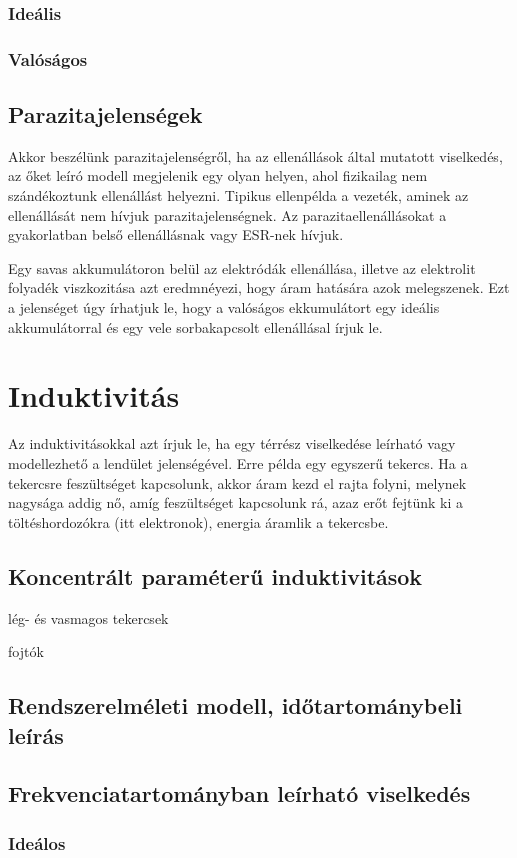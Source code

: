 \documentclass[12pt,a4paper]{article}
\begin{document}
\subsubsection{Ideális}
\subsubsection{Valóságos}
\subsection{Parazitajelenségek}
Akkor beszélünk parazitajelenségről, ha az ellenállások által mutatott viselkedés, az őket leíró modell megjelenik egy olyan helyen, ahol fizikailag nem szándékoztunk ellenállást helyezni. Tipikus ellenpélda a vezeték, aminek az ellenállását nem hívjuk parazitajelenségnek. Az parazitaellenállásokat a gyakorlatban belső ellenállásnak vagy ESR-nek hívjuk. \par
Egy savas akkumulátoron belül az elektródák ellenállása, illetve az elektrolit folyadék viszkozitása azt eredmnéyezi, hogy áram hatására azok melegszenek. Ezt a jelenséget úgy írhatjuk le, hogy a valóságos ekkumulátort egy ideális akkumulátorral és egy vele sorbakapcsolt ellenállásal írjuk le.


\section{Induktivitás}
Az induktivitásokkal azt írjuk le, ha egy térrész viselkedése leírható vagy modellezhető a lendület jelenségével. Erre példa egy egyszerű tekercs. Ha a tekercsre feszültséget kapcsolunk, akkor áram kezd el rajta folyni, melynek nagysága addig nő, amíg feszültséget kapcsolunk rá, azaz erőt fejtünk ki a töltéshordozókra (itt elektronok), energia áramlik a tekercsbe.
\subsection{Koncentrált paraméterű induktivitások}
lég- és vasmagos tekercsek \par
fojtók
\subsection{Rendszerelméleti modell, időtartománybeli leírás}
\subsection{Frekvenciatartományban leírható viselkedés}
\subsubsection{Ideálos}
\end{document}
